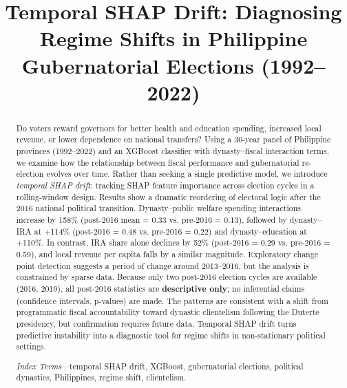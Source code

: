 \documentclass[conference]{IEEEtran}
\begin{document}
\title{Temporal SHAP Drift: Diagnosing Regime Shifts in Philippine Gubernatorial Elections (1992--2022)}

\author{
}

\maketitle

\begin{abstract}
Do voters reward governors for better health and education spending, increased local revenue, or lower dependence on national transfers? Using a 30-year panel of Philippine provinces (1992--2022) and an XGBoost classifier with dynasty--fiscal interaction terms, we examine how the relationship between fiscal performance and gubernatorial re-election evolves over time. Rather than seeking a single predictive model, we introduce \emph{temporal SHAP drift}: tracking SHAP feature importance across election cycles in a rolling-window design. Results show a dramatic reordering of electoral logic after the 2016 national political transition. Dynasty–public welfare spending interactions increase by 158\% (post-2016 mean = 0.33 vs. pre-2016 = 0.13), followed by dynasty–IRA at +114\% (post-2016 = 0.48 vs. pre-2016 = 0.22) and dynasty–education at +110\%. In contrast, IRA share alone declines by 52\% (post-2016 = 0.29 vs. pre-2016 = 0.59), and local revenue per capita falls by a similar magnitude. Exploratory change point detection suggests a period of change around 2013–2016, but the analysis is constrained by sparse data. Because only two post-2016 election cycles are available (2016, 2019), all post-2016 statistics are \textbf{descriptive only}; no inferential claims (confidence intervals, p-values) are made. The patterns are consistent with a shift from programmatic fiscal accountability toward dynastic clientelism following the Duterte presidency, but confirmation requires future data. Temporal SHAP drift turns predictive instability into a diagnostic tool for regime shifts in non-stationary political settings.

\vspace{0.5em}
\noindent\textit{Index Terms}---temporal SHAP drift, XGBoost, gubernatorial elections, political dynasties, Philippines, regime shift, clientelism.
\end{abstract}
\end{document}
